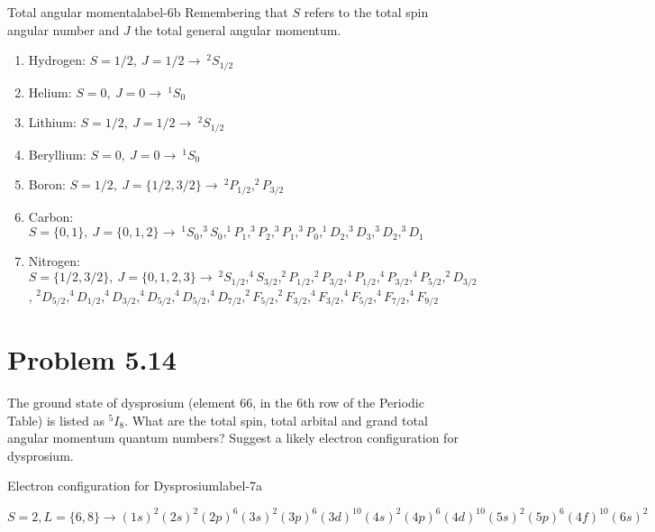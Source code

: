\documentclass[../main.tex]{subfiles}
\begin{document}
\begin{sol}{Total angular momenta}{label-6b}
    Remembering that $S$ refers to the total spin angular number and $J$ the total general angular momentum.

    \begin{enumerate}
        \item Hydrogen: $S=1/2,~J=1/2\rightarrow~^{2}S_{1/2}$
        \item Helium: $S=0,~J=0\rightarrow~^{1}S_{0}$
        \item Lithium: $S=1/2,~J=1/2\rightarrow~^{2}S_{1/2}$
        \item Beryllium: $S=0,~J=0\rightarrow~^{1}S_{0}$
        \item Boron: $S=1/2,~J=\{1/2,3/2\}\rightarrow~^{2}P_{1/2},^{2}P_{3/2}$
        \item Carbon: $S=\{0,1\},~J=\{0,1,2\}\rightarrow~^{1}S_{0},^{3}S_{0},^{1}P_{1},^{3}P_{2},^{3}P_{1},^{3}P_{0},^{1}D_{2},^{3}D_{3},^{3}D_{2},^{3}D_{1}$ 
        \item Nitrogen: $S=\{1/2,3/2\},~J=\{0,1,2,3\}\rightarrow~^{2}S_{1/2},^{4}S_{3/2},^{2}P_{1/2},^{2}P_{3/2},^{4}P_{1/2},^{4}P_{3/2},^{4}P_{5/2},^{2}D_{3/2}$, $^{2}D_{5/2},^{4}D_{1/2},^{4}D_{3/2},^{4}D_{5/2},^{4}D_{5/2},^{4}D_{7/2},^2F_{5/2},^2F_{3/2},^4F_{3/2},^4F_{5/2},^4F_{7/2},^4F_{9/2}$ 
    \end{enumerate}

\end{sol}


\section{Problem 5.14}

The ground state of dysprosium (element 66, in the 6th row of the Periodic Table) is listed as $^5I_8$.
What are the total spin, total arbital and grand total angular momentum quantum numbers?
Suggest a likely electron configuration for dysprosium.

\begin{sol}{Electron configuration for Dysprosium}{label-7a}

    $S=2,L=\{6,8\}\rightarrow(1s)^2(2s)^2(2p)^6(3s)^2(3p)^6(3d)^{10}(4s)^2(4p)^6(4d)^{10}(5s)^2(5p)^6(4f)^{10}(6s)^2$

\end{sol}
\end{document}
